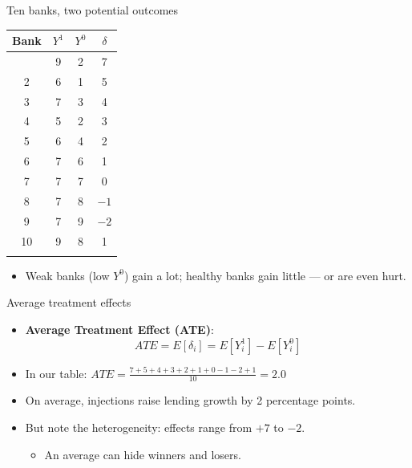 \documentclass[
  11pt,
  ignorenonframetext,
  aspectratio=169,
]{beamer}
\newcounter{none} %
\providecommand{\tightlist}{%
  \setlength{\itemsep}{0pt}\setlength{\parskip}{0pt}}
\begin{document}
\begin{frame}{Ten banks, two potential outcomes}
\protect{}\label{ten-banks-two-potential-outcomes}
{\def\LTcaptype{none} %
\begin{longtable}[]{@{}cccc@{}}
\toprule\noalign{}
Bank & \(Y^1\) & \(Y^0\) & \(\delta\) \\
\midrule\noalign{}
\endhead
1 & 9 & 2 & 7 \\
2 & 6 & 1 & 5 \\
3 & 7 & 3 & 4 \\
4 & 5 & 2 & 3 \\
5 & 6 & 4 & 2 \\
6 & 7 & 6 & 1 \\
7 & 7 & 7 & 0 \\
8 & 7 & 8 & \(-1\) \\
9 & 7 & 9 & \(-2\) \\
10 & 9 & 8 & 1 \\
\bottomrule\noalign{}
\end{longtable}
}

\begin{itemize}
\tightlist
\item
  Weak banks (low \(Y^0\)) gain a lot; healthy banks gain little --- or
  are even hurt.
\end{itemize}
\end{frame}

\begin{frame}{Average treatment effects}
\protect{}\label{average-treatment-effects}
\begin{itemize}
\tightlist
\item
  \textbf{Average Treatment Effect (ATE)}: \[
  ATE = E[\delta_i] = E[Y_i^1] - E[Y_i^0]
  \]
\item
  In our table: \(ATE = \frac{7+5+4+3+2+1+0-1-2+1}{10} = 2.0\)
\item
  On average, injections raise lending growth by 2 percentage points.
\item
  But note the heterogeneity: effects range from \(+7\) to \(-2\).

  \begin{itemize}
  \tightlist
  \item
    An average can hide winners and losers.
  \end{itemize}
\end{itemize}
\end{frame}
\end{document}
